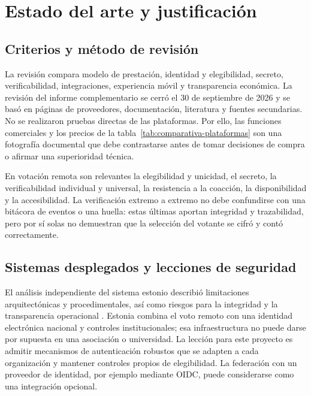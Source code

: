 \chapter{Estado del arte y justificación}
\label{cap:estado-arte}

\section{Criterios y método de revisión}
\label{sec:criterios-revision}

La revisión compara modelo de prestación, identidad y elegibilidad, secreto,
verificabilidad, integraciones, experiencia móvil y transparencia económica.
La revisión del informe complementario se cerró el 30 de septiembre de 2026 y
se basó en páginas de proveedores, documentación, literatura y fuentes
secundarias. No se realizaron pruebas directas de las plataformas. Por ello,
las funciones comerciales y los precios de la tabla~\ref{tab:comparativa-plataformas}
son una fotografía documental que debe contrastarse antes de tomar decisiones
de compra o afirmar una superioridad técnica.

En votación remota son relevantes la elegibilidad y unicidad, el secreto, la
verificabilidad individual y universal, la resistencia a la coacción, la
disponibilidad y la accesibilidad. La verificación extremo a extremo no debe
confundirse con una bitácora de eventos o una huella: estas últimas aportan
integridad y trazabilidad, pero por sí solas no demuestran que la selección
del votante se cifró y contó correctamente.

\section{Sistemas desplegados y lecciones de seguridad}
\label{sec:casos-reales-voto}

El análisis independiente del sistema estonio describió limitaciones
arquitectónicas y procedimentales, así como riesgos para la integridad y la
transparencia operacional \citep{springall2014estonia}. Estonia combina el
voto remoto con una identidad electrónica nacional y controles institucionales;
esa infraestructura no puede darse por supuesta en una asociación o universidad.
La lección para este proyecto es admitir mecanismos de autenticación robustos
que se adapten a cada organización y mantener controles propios de elegibilidad.
La federación con un proveedor de identidad, por ejemplo mediante OIDC, puede
considerarse como una integración opcional.

